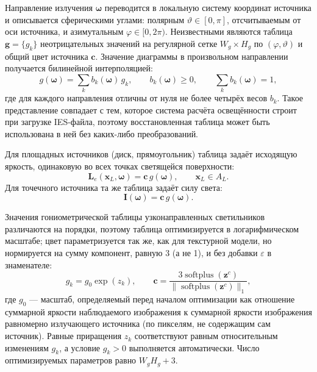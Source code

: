 Направление излучения $\boldsymbol{\omega}$ переводится в локальную систему координат источника и описывается сферическими углами: полярным $\vartheta\in[0,\pi]$, отсчитываемым от оси источника, и азимутальным $\varphi\in[0,2\pi)$. Неизвестными являются таблица $\mathbf{g}=\{g_k\}$ неотрицательных значений на регулярной сетке $W_g\times H_g$ по $(\varphi,\vartheta)$ и общий цвет источника $\mathbf{c}$. Значение диаграммы в произвольном направлении получается билинейной интерполяцией:
\begin{equation}
g(\boldsymbol{\omega})
=
\sum_{k} b_k(\boldsymbol{\omega})\,g_k,
\qquad
b_k(\boldsymbol{\omega})\geq 0,
\qquad
\sum_k b_k(\boldsymbol{\omega})=1,
\label{eq:ies-interp}
\end{equation}
где для каждого направления отличны от нуля не более четырёх весов $b_k$. Такое представление совпадает с тем, которое система расчёта освещённости строит при загрузке IES-файла, поэтому восстановленная таблица может быть использована в ней без каких-либо преобразований.

Для площадных источников (диск, прямоугольник) таблица задаёт исходящую яркость, одинаковую во всех точках светящейся поверхности:
\begin{equation}
\mathbf{L}_e(\mathbf{x}_L,\boldsymbol{\omega})
=
\mathbf{c}\,g(\boldsymbol{\omega}),
\qquad
\mathbf{x}_L\in A_L.
\end{equation}
Для точечного источника та же таблица задаёт силу света:
\begin{equation}
\mathbf{I}(\boldsymbol{\omega})
=
\mathbf{c}\,g(\boldsymbol{\omega}).
\end{equation}

Значения гониометрической таблицы узконаправленных светильников различаются на порядки, поэтому таблица оптимизируется в логарифмическом масштабе; цвет параметризуется так же, как для текстурной модели, но нормируется на сумму компонент, равную 3 (а не 1), и без добавки $\varepsilon$ в знаменателе:
\begin{equation}
g_k=g_0\exp(z_k),
\qquad
\mathbf{c}=
\frac{3\operatorname{softplus}(\mathbf{z}^c)}
{\|\operatorname{softplus}(\mathbf{z}^c)\|_1},
\end{equation}
где $g_0$ --- масштаб, определяемый перед началом оптимизации как отношение суммарной яркости наблюдаемого изображения к суммарной яркости изображения равномерно излучающего источника (по пикселям, не содержащим сам источник). Равные приращения $z_k$ соответствуют равным относительным изменениям $g_k$, а условие $g_k>0$ выполняется автоматически. Число оптимизируемых параметров равно $W_gH_g+3$.

